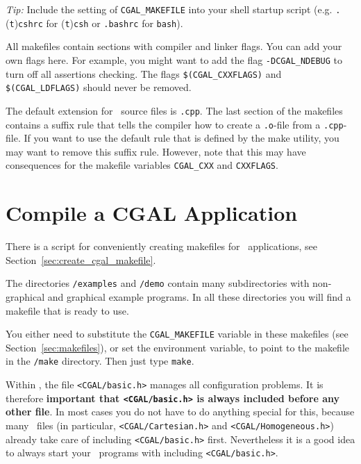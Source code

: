 \textit{Tip:} Include the setting of \texttt{CGAL\_MAKEFILE} into your
shell startup script (e.g. \texttt{.}(\texttt{t})\texttt{cshrc} for
(\texttt{t})\texttt{csh} or \texttt{.bashrc} for \texttt{bash}).

All makefiles contain sections with compiler and linker flags.  You
can add your own flags here. For example, you might want to add the
flag \texttt{-DCGAL\_NDEBUG} to turn off all assertions
checking. The flags \texttt{\$(CGAL\_CXXFLAGS)} and
\texttt{\$(CGAL\_LDFLAGS)} should never be removed.

The default extension for \cgal\ source files is \texttt{.cpp}.  The
last section of the makefiles contains a suffix rule that tells the
compiler how to create a \texttt{.o}-file from a \texttt{.cpp}-file.  If
you want to use the default rule that is defined by the make utility,
you may want to remove this suffix rule.  However, note that this may
have consequences for the makefile variables \texttt{CGAL\_CXX} and
\texttt{CXXFLAGS}.

\section{Compile a CGAL Application\label{sec:appl}}

There is a script for conveniently creating makefiles for \cgal\
applications, see Section~\ref{sec:create_cgal_makefile}.

The directories \texttt{\cgaldir/examples} and \texttt{\cgaldir/demo}
contain many subdirectories with non-graphical and graphical example
programs. In all these directories you will find a makefile that is
ready to use.

You either need to substitute the \texttt{CGAL\_MAKEFILE} variable in
these makefiles (see Section~\ref{sec:makefiles}), or set the
environment variable, to point to the makefile in the
\texttt{\cgaldir/make} directory. Then just type \texttt{make}.

Within \cgal, the file \texttt{<CGAL/basic.h>}
 manages all configuration problems. It
is therefore \textbf{important that \texttt{<CGAL/basic.h>} is always
  included before any other file}. In most cases you do not have to do
anything special for this, because many \cgal\ files (in particular,
\texttt{<CGAL/Cartesian.h>} and \texttt{<CGAL/Homogeneous.h>}) already
take care of including \texttt{<CGAL/basic.h>} first. Nevertheless it
is a good idea to always start your \cgal\ programs with including
\texttt{<CGAL/basic.h>}.

